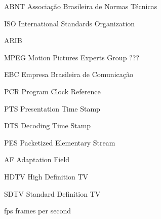 \begin{siglas}
  \item[ABNT] Associação Brasileira de Normas Técnicas
  \item[ISO] International Standards Organization
  \item[ARIB]
  \item[MPEG] Motion Pictures Experts Group ???
  \item[EBC] Empresa Brasileira de Comunicação
  \item[PCR] Program Clock Reference
  \item[PTS] Presentation Time Stamp
  \item[DTS] Decoding Time Stamp
  \item[PES] Packetized Elementary Stream
  \item[AF] Adaptation Field
  \item[HDTV] High Definition TV
  \item[SDTV] Standard Definition TV
  \item[fps] frames per second
  \item[]
  \item[]
  \item[]
  \item[]
  \item[]
  
  
\end{siglas}